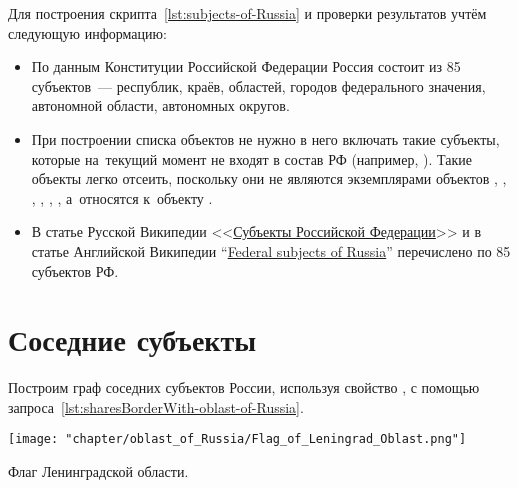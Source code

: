 Для построения скрипта~\ref{lst:subjects-of-Russia} и проверки результатов учтём следующую информацию:
\begin{itemize}
  \item По данным Конституции Российской Федерации Россия состоит из 85 субъектов~--- республик, краёв, областей, городов федерального значения, автономной области, автономных округов.
  \item При построении списка объектов не нужно в него включать такие субъекты, 
      которые на~текущий момент не входят в состав РФ (например, ). 
      Такие объекты легко отсеить, поскольку 
        они не являются экземплярами объектов , 
        , 
        , 
        , 
        , 
        , 
      а~относятся к~объекту . 
  \item В статье Русской Википедии <<\href{https://ru.wikipedia.org/?curid=1042}{Субъекты Российской Федерации}>> 
        и в статье Английской Википедии ``\href{https://en.wikipedia.org/wiki/Federal_subjects_of_Russia}{Federal subjects of Russia}'' 
        перечислено по 85 субъектов РФ.
\end{itemize}





\section{Соседние субъекты}

Построим граф соседних субъектов России, используя свойство , 
с помощью запроса~\ref{lst:sharesBorderWith-oblast-of-Russia}.

\label{question:q_subjects_of_Russia_1}
\begin{marginfigure}[0.0cm]
\centering\texttt{[image: "chapter/oblast\_of\_Russia/Flag\_of\_Leningrad\_Oblast.png"]}
\caption [Флаг Ленинградской области.]{Флаг Ленинградской области.}%
\label{fig:Flag_of_Leningrad_Oblast}%
\end{marginfigure}

